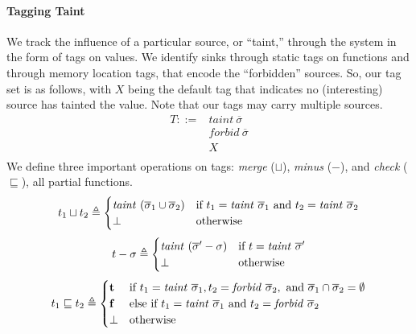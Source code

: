 \documentclass{article}
\begin{document}
\paragraph{Tagging Taint}

We track the influence of a particular source, or ``taint,'' through the system in the form
of tags on values. We identify sinks through static tags on functions and through memory location tags,
that encode the ``forbidden'' sources. So, our tag set is as follows, with \(X\) being the
default tag that indicates no (interesting) source has tainted the value. Note that our
tags may carry multiple sources.
%
\begin{align*}
  T ::= & \mathit{taint} ~ \overline{\sigma} \\
  & \mathit{forbid} ~ \overline{\sigma} \\
  & X \\
\end{align*}
%
We define three important operations on tags: {\em merge} (\(\sqcup\)), {\em minus} (\(-\)),
and {\em check} (\(\sqsubseteq\)), all partial functions.
%
\[t_1 \sqcup t_2 \triangleq
\begin{cases}
  \mathit{taint} ~ (\overline{\sigma}_1 \cup \overline{\sigma}_2) &
  \textnormal{if } t_1 = \mathit{taint} ~ \overline{\sigma}_1 \textnormal{ and }
  t_2 = \mathit{taint} ~ \overline{\sigma}_2\\
  \bot & \textnormal{otherwise} \\
\end{cases}\]
%
\[t - \sigma \triangleq
\begin{cases}
  \mathit{taint} ~ (\overline{\sigma}' - \sigma) &
  \textnormal{if } t = \mathit{taint} ~ \overline{\sigma}' \\
  \bot & \textnormal{otherwise} \\
\end{cases}\]
%
\[t_1 \sqsubseteq t_2 \triangleq
\begin{cases}
  \mathbf{t} & \textnormal{if } t_1 = \mathit{taint} ~ \overline{\sigma}_1,
  t_2 = \mathit{forbid} ~ \overline{\sigma}_2, \textnormal{ and }
  \overline{\sigma}_1 \cap \overline{\sigma}_2 = \emptyset \\
  \mathbf{f} & \textnormal{else if } t_1 = \mathit{taint} ~ \overline{\sigma}_1 \textnormal{ and }
  t_2 = \mathit{forbid} ~ \overline{\sigma}_2 \\
  \bot & \textnormal{otherwise} \\
\end{cases}\]
\end{document}
